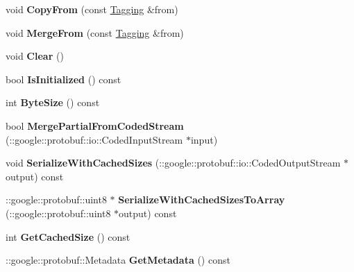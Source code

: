\begin{DoxyCompactItemize}
\item 
\hypertarget{classTagging_ab2271da80aa840cfa9b2de493b3eeb1f}{
void {\bfseries CopyFrom} (const \hyperlink{classTagging}{Tagging} \&from)}
\label{classTagging_ab2271da80aa840cfa9b2de493b3eeb1f}

\item 
\hypertarget{classTagging_a13d8b75c40ac5f295bc61a2f3f94c3b0}{
void {\bfseries MergeFrom} (const \hyperlink{classTagging}{Tagging} \&from)}
\label{classTagging_a13d8b75c40ac5f295bc61a2f3f94c3b0}

\item 
\hypertarget{classTagging_a43f8e265b50703f56a295083d3aa9676}{
void {\bfseries Clear} ()}
\label{classTagging_a43f8e265b50703f56a295083d3aa9676}

\item 
\hypertarget{classTagging_ab5617848ff03416f1ab4d98e2bfdef26}{
bool {\bfseries IsInitialized} () const }
\label{classTagging_ab5617848ff03416f1ab4d98e2bfdef26}

\item 
\hypertarget{classTagging_a6c2f74cb255bb4913fd279c6f3254729}{
int {\bfseries ByteSize} () const }
\label{classTagging_a6c2f74cb255bb4913fd279c6f3254729}

\item 
\hypertarget{classTagging_a1c8cf78b674f62c201f31e2b6ad721f2}{
bool {\bfseries MergePartialFromCodedStream} (::google::protobuf::io::CodedInputStream $\ast$input)}
\label{classTagging_a1c8cf78b674f62c201f31e2b6ad721f2}

\item 
\hypertarget{classTagging_afbd4d173621ed8cfc227dbcceec933d6}{
void {\bfseries SerializeWithCachedSizes} (::google::protobuf::io::CodedOutputStream $\ast$output) const }
\label{classTagging_afbd4d173621ed8cfc227dbcceec933d6}

\item 
\hypertarget{classTagging_a758bb0408c843056d4c70b917d02509b}{
::google::protobuf::uint8 $\ast$ {\bfseries SerializeWithCachedSizesToArray} (::google::protobuf::uint8 $\ast$output) const }
\label{classTagging_a758bb0408c843056d4c70b917d02509b}

\item 
\hypertarget{classTagging_a4661d58542895ed97b5e55ffb7d19f0c}{
int {\bfseries GetCachedSize} () const }
\label{classTagging_a4661d58542895ed97b5e55ffb7d19f0c}

\item 
\hypertarget{classTagging_a7d324ff2794e15d2c55c7238e173b520}{
::google::protobuf::Metadata {\bfseries GetMetadata} () const }
\label{classTagging_a7d324ff2794e15d2c55c7238e173b520}


\end{DoxyCompactItemize}
